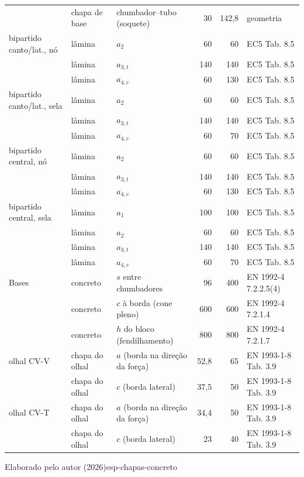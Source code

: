{\begin{tabular}{@{}lllrrl@{}}
     & chapa de base & chumbador–tubo (soquete) & 30 & 142,8 & geometria \\
    bipartido canto/lat., nó & lâmina & $a_2$ & 60 & 60 & EC5 Tab. 8.5 \\
     & lâmina & $a_{3,t}$ & 140 & 140 & EC5 Tab. 8.5 \\
     & lâmina & $a_{4,c}$ & 60 & 130 & EC5 Tab. 8.5 \\
    bipartido canto/lat., sela & lâmina & $a_2$ & 60 & 60 & EC5 Tab. 8.5 \\
     & lâmina & $a_{3,t}$ & 140 & 140 & EC5 Tab. 8.5 \\
     & lâmina & $a_{4,c}$ & 60 & 70 & EC5 Tab. 8.5 \\
    bipartido central, nó & lâmina & $a_2$ & 60 & 60 & EC5 Tab. 8.5 \\
     & lâmina & $a_{3,t}$ & 140 & 140 & EC5 Tab. 8.5 \\
     & lâmina & $a_{4,c}$ & 60 & 130 & EC5 Tab. 8.5 \\
    bipartido central, sela & lâmina & $a_1$ & 100 & 100 & EC5 Tab. 8.5 \\
     & lâmina & $a_2$ & 60 & 60 & EC5 Tab. 8.5 \\
     & lâmina & $a_{3,t}$ & 140 & 140 & EC5 Tab. 8.5 \\
     & lâmina & $a_{4,c}$ & 60 & 70 & EC5 Tab. 8.5 \\
    Bases & concreto & $s$ entre chumbadores & 96 & 400 & EN 1992-4 7.2.2.5(4) \\
     & concreto & $c$ à borda (cone pleno) & 600 & 600 & EN 1992-4 7.2.1.4 \\
     & concreto & $h$ do bloco (fendilhamento) & 800 & 800 & EN 1992-4 7.2.1.7 \\
    olhal CV-V & chapa do olhal & $a$ (borda na direção da força) & 52,8 & 65 & EN 1993-1-8 Tab. 3.9 \\
     & chapa do olhal & $c$ (borda lateral) & 37,5 & 50 & EN 1993-1-8 Tab. 3.9 \\
    olhal CV-T & chapa do olhal & $a$ (borda na direção da força) & 34,4 & 50 & EN 1993-1-8 Tab. 3.9 \\
     & chapa do olhal & $c$ (borda lateral) & 23 & 40 & EN 1993-1-8 Tab. 3.9 \\
\bottomrule
\end{tabular}}{Elaborado pelo autor (2026)}{esp-chapas-concreto}{}{}

